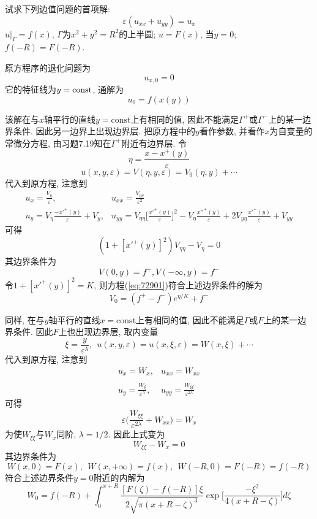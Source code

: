 \begin{problem}[习题7.29]
试求下列边值问题的首项解:
\[
\varepsilon(u_{xx}+u_{yy})=u_{x}
\]
$u|_{\Gamma}=f(x)$, $\Gamma$为$x^{2}+y^{2}=R^{2}$的上半圆; $u=F(x)$, 当$y=0$; $f(-R)=F(-R)$.
\end{problem}

\begin{solution}
\begin{multicols}{2}
\noindent 原方程序的退化问题为
\[
u_{x,0}=0
\]
它的特征线为$y=\textrm{\textrm{const}}$, 通解为
\[
u_{0}=f(x(y))
\]

\begin{center}

\end{center}
\end{multicols}
\noindent 该解在与$x$轴平行的直线$y=\textrm{const}$上有相同的值, 因此不能满足$\Gamma^{+}$或$\Gamma^{-}$上的某一边界条件.
因此另一边界上出现边界层. 把原方程中的$y$看作参数, 并看作$x$为自变量的常微分方程, 由习题7.19知在$\Gamma^{+}$附近有边界层.
令
\[
\eta=\frac{x-x^{+}(y)}{\varepsilon}
\]
\[
u(x,y,\varepsilon)=V(\eta,y,\varepsilon)=V_{0}(\eta,y)+\cdots
\]
代入到原方程, 注意到
\[
\begin{array}{ll}
\displaystyle u_{x}=\frac{V_{\eta}}{\varepsilon}, & \displaystyle u_{xx}=\frac{V_{\eta\eta}}{\varepsilon^{2}}\\
\displaystyle u_{y}=V_{\eta}\frac{-{x'}^{+}(y)}{\varepsilon}+V_{y}, & \displaystyle u_{yy}=V_{\eta\eta}\Big[\frac{{x'}^{+}(y)}{\varepsilon}\Big]^{2}-V_{\eta}\frac{{x''}^{+}(y)}{\varepsilon}+2V_{y\eta}\frac{{x'}^{+}(y)}{\varepsilon}+V_{yy}
\end{array}
\]
可得
\begin{equation}
(1+[{x'}^{+}(y)]^{2})V_{\eta\eta}-V_{\eta}=0\label{eq:72901}
\end{equation}
其边界条件为
\[
V(0,y)=f^{+},V(-\infty,y)=f^{-}
\]
令$1+[{x'}^{+}(y)]^{2}=K$, 则方程(\ref{eq:72901})符合上述边界条件的解为
\[
V_{0}=(f^{+}-f^{-})e^{\eta/K}+f^{-}
\]


\vspace{1em}

\noindent 同样, 在与$y$轴平行的直线$x=\textrm{const}$上有相同的值, 因此不能满足$\Gamma$或$F$上的某一边界条件.
因此$F$上也出现边界层, 取内变量
\[
\xi=\frac{y}{\varepsilon^{\lambda}}, ~~ u(x,y,\varepsilon)=u(x,\xi,\varepsilon)=W(x,\xi)+\cdots
\]
代入到原方程, 注意到
\[
\begin{array}{ll}
\displaystyle u_{x}=W_{x}, & \displaystyle u_{xx}=W_{xx}\\
 &  \\
\displaystyle u_{y}=\frac{W_{\xi}}{\varepsilon^{\lambda}}, & \displaystyle u_{yy}=\frac{W_{\xi\xi}}{\varepsilon^{2\lambda}}
\end{array}
\]
可得
\[
\varepsilon\Big(\frac{W_{\xi\xi}}{\varepsilon^{2\lambda}}+W_{xx}\Big)=W_{x}
\]
为使$W_{\xi\xi}$与$W_{x}$同阶, $\lambda=1/2$. 因此上式变为
\[
W_{\xi\xi}-W_{x}=0
\]
其边界条件为
\[
W(x,0)=F(x), ~~ W(x,+\infty)=f(x), ~~ W(-R,0)=F(-R)=f(-R)
\]
符合上述边界条件$y=0$附近的内解为
\[
W_{0}=f(-R)+\int_{0}^{x+R}\frac{[F(\zeta)-f(-R)]\xi}{2\sqrt{\pi(x+R-\zeta)^{3}}}\exp\Big[\frac{-\xi^{2}}{4(x+R-\zeta)}\Big]d\zeta
\]

\end{solution}
